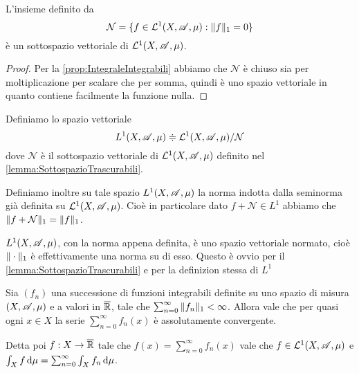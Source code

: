 \begin{lemma}\label{lemma:SottospazioTrascurabili}
	L'insieme definito da
	\begin{equation*}
		\mathcal{N}=\{ f\in\mathcal L^1(X,\mathscr A,\mu) : \Vert f\Vert_1=0\}
	\end{equation*}
	è un sottospazio vettoriale di $\mathcal L^1(X,\mathscr A,\mu)$.
\end{lemma}
\begin{proof}
	Per la \cref{prop:IntegraleIntegrabili} abbiamo che $\mathcal{N}$ è chiuso sia per moltiplicazione per scalare che per somma, quindi è uno spazio vettoriale in quanto contiene facilmente la funzione nulla.
\end{proof}

\begin{definition}
	Definiamo lo spazio vettoriale
	\begin{equation*}
		L^1(X,\mathscr A,\mu)\doteqdot \mathcal L^1(X,\mathscr A,\mu)/\mathcal{N}
	\end{equation*}
	dove $\mathcal{N}$ è il sottospazio vettoriale di $\mathcal L^1(X,\mathscr A,\mu)$ definito nel \cref{lemma:SottospazioTrascurabili}.
	
	Definiamo inoltre su tale spazio $L^1(X,\mathscr A,\mu)$ la norma indotta dalla seminorma già definita su $\mathcal L^1(X,\mathscr A,\mu)$. Cioè in particolare dato $f+\mathcal{N}\in L^1$ abbiamo che $\Vert f+\mathcal{N}\Vert_1=\Vert f\Vert_1$.
\end{definition}

\begin{remark}
	$L^1(X,\mathscr A,\mu)$, con la norma appena definita, è uno spazio vettoriale normato, cioè $\Vert \cdot\Vert_1$ è effettivamente una norma su di esso. Questo è ovvio per il \cref{lemma:SottospazioTrascurabili} e per la definizion stessa di $L^1$
\end{remark}


\begin{theorem}\label{thm:IntegrazionePerSerie}
	Sia $(f_n)$ una successione di funzioni integrabili definite su uno spazio di misura $(X,\mathscr A,\mu)$ e a valori in $\overline{\mathbb R}$, tale che $\sum_{n=0}^{\infty}\Vert f_n\Vert_1<\infty$. Allora vale che per quasi ogni $x\in X$ la serie $\sum_{n=0}^\infty f_n(x)$ è assolutamente convergente. 
	
	Detta poi $f:X\to\overline{\mathbb R}$ tale che $f(x)=\sum_{n=0}^\infty f_n(x)$ vale che $f\in \mathcal L^1(X,\mathscr A,\mu)$ e $\int_X f\,\mathrm d\mu=\sum_{n=0}^\infty \int_X f_n\,\mathrm d\mu$.
\end{theorem}

